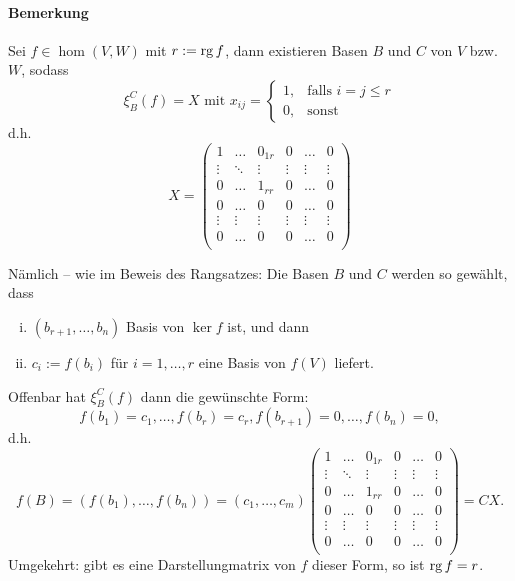 	\paragraph{Bemerkung}
		Sei $ f\in \hom(V,W) $ mit $ r:= \operatorname{rg} f $, dann existieren Basen $ B $ und $ C $ von $ V $ bzw. $ W $, sodass
		\[
			\xi_B^C(f) = X \text{ mit } x_{ij} =
			\begin{cases}
				1, & \text{falls }i=j\leq r \\
				0, & \text{sonst}
			\end{cases}
		\]
		d.h.
		\[
			X = \left(
			\begin{array}{ccc|ccc}
				1      & \dots  & 0_{1r} & 0      & \dots  & 0      \\
				\vdots & \ddots & \vdots & \vdots & \vdots & \vdots \\
				0      & \dots  & 1_{rr} & 0      & \dots  & 0      \\\hline
				0      & \dots  & 0      & 0      & \dots  & 0      \\
				\vdots & \vdots & \vdots & \vdots & \vdots & \vdots \\
				0      & \dots  & 0      & 0      & \dots  & 0      \\
			\end{array}
			\right)
		\]

		Nämlich -- wie im Beweis des Rangsatzes: Die Basen $ B $ und $ C $ werden so gewählt, dass
		\begin{enumerate}[(i)]
			\item $ (b_{r+1},\dots,b_n) $ Basis von $ \ker f $ ist, und dann
			\item $ c_i := f(b_i) $ für $ i= 1,\dots,r $ eine Basis von $ f(V) $ liefert.
		\end{enumerate}
		Offenbar hat $ \xi_B^C(f)$ dann die gewünschte Form:
		\[
			f(b_1)=c_1,\dots,f(b_r)=c_r,f(b_{r+1})=0,\dots,f(b_n)=0,
		\]
		d.h.
		\[
			f(B) = (f(b_1),\dots,f(b_n))=(c_1,\dots,c_m)\left(
			\begin{array}{ccc|ccc}
				1      & \dots  & 0_{1r} & 0      & \dots  & 0      \\
				\vdots & \ddots & \vdots & \vdots & \vdots & \vdots \\
				0      & \dots  & 1_{rr} & 0      & \dots  & 0      \\\hline
				0      & \dots  & 0      & 0      & \dots  & 0      \\
				\vdots & \vdots & \vdots & \vdots & \vdots & \vdots \\
				0      & \dots  & 0      & 0      & \dots  & 0      \\
			\end{array}
			\right) = CX.
		\]
		Umgekehrt: gibt es eine Darstellungmatrix von $ f $ dieser Form, so ist $ \operatorname{rg} f = r $.
